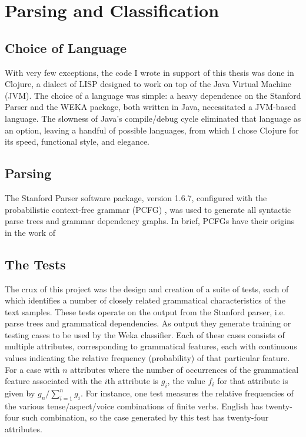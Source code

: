 \documentclass[main.tex]{subfiles}
\begin{document}
\section{Parsing and Classification}

\subsection{Choice of Language}

With very few exceptions, the code I wrote in support of this thesis was done in Clojure, a dialect of LISP designed to work on top of the Java Virtual Machine (JVM). The choice of a language was simple: a heavy dependence on the Stanford Parser and the WEKA package, both written in Java, necessitated a JVM-based language. The slowness of Java's compile/debug cycle eliminated that language as an option, leaving a handful of possible languages, from which I chose Clojure for its speed, functional style, and elegance.

\subsection{Parsing}

The Stanford Parser software package, version 1.6.7, configured with the probabilistic context-free grammar (PCFG) \citep*{klein-manning-pcfg:2003}, was used to generate all syntactic parse trees and grammar dependency graphs. In brief, PCFGs have their origins in the work of 

\subsection{The Tests}
The crux of this project was the design and creation of a suite of tests, each of which identifies a number of closely related grammatical characteristics of the text samples. These tests operate on the output from the Stanford parser, i.e. parse trees and grammatical dependencies. As output they generate training or testing cases to be used by the Weka classifier. Each of these cases consists of multiple attributes, corresponding to grammatical features, each with continuous values indicating the relative frequency (probability) of that particular feature. For a case with $n$ attributes where the number of occurrences of the grammatical feature associated with the $i$th attribute is $g_i$, the value $f_i$ for that attribute is given by $g_n  / \displaystyle\sum\limits_{i=1}^n g_i$. For instance, one test measures the relative frequencies of the various tense/aspect/voice combinations of finite verbs. English has twenty-four such combination, so the case generated by this test has twenty-four attributes.
\end{document}
